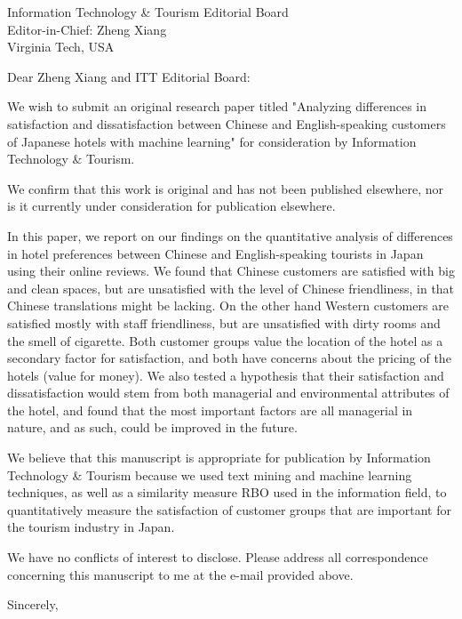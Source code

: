 \documentclass{letter}
\begin{document}
\begin{letter}{
Information Technology \& Tourism Editorial Board \\
Editor-in-Chief:  Zheng Xiang\\
Virginia Tech, USA}

\opening{Dear Zheng Xiang and ITT Editorial Board:}

We wish to submit an original research paper titled "Analyzing differences in satisfaction and dissatisfaction between Chinese and English-speaking customers of Japanese hotels with machine learning" for consideration by Information Technology \& Tourism.

We confirm that this work is original and has not been published elsewhere, nor is it currently under consideration for publication elsewhere. 

In this paper, we report on our findings on the quantitative analysis of differences in hotel preferences between Chinese and English-speaking tourists in Japan using their online reviews. We found that Chinese customers are satisfied with big and clean spaces, but are unsatisfied with the level of Chinese friendliness, in that Chinese translations might be lacking. On the other hand Western customers are satisfied mostly with staff friendliness, but are unsatisfied with dirty rooms and the smell of cigarette. Both customer groups value the location of the hotel as a secondary factor for satisfaction, and both have concerns about the pricing of the hotels (value for money). We also tested a hypothesis that their satisfaction and dissatisfaction would stem from both managerial and environmental attributes of the hotel, and found that the most important factors are all managerial in nature, and as such, could be improved in the future.

We believe that this manuscript is appropriate for publication by Information Technology \& Tourism because we used text mining and machine learning techniques, as well as a similarity measure RBO used in the information field, to quantitatively measure the satisfaction of customer groups that are important for the tourism industry in Japan.

We have no conflicts of interest to disclose. Please address all correspondence concerning this manuscript to me at the e-mail provided above.

\closing{Sincerely,}


\end{letter}
\end{document}
